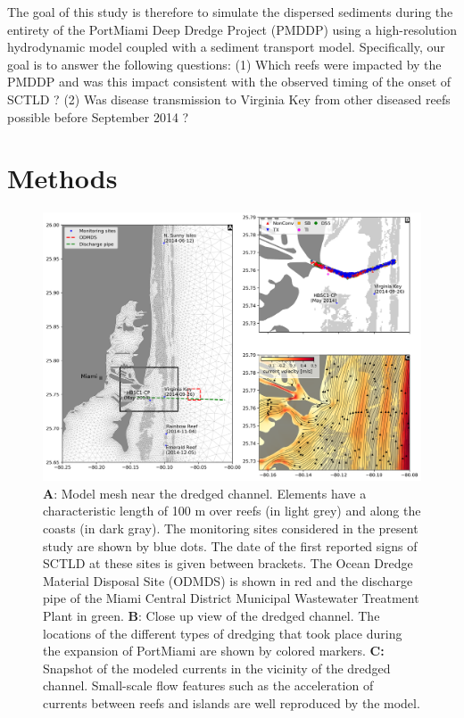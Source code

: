 \documentclass[preprint,12pt,authoryear]{elsarticle}
\begin{document}
The goal of this study is therefore to simulate the dispersed sediments during the entirety of the PortMiami Deep Dredge Project (PMDDP) using a high-resolution hydrodynamic model coupled with a sediment transport model. Specifically, our goal is to answer the following questions: (1) Which reefs were impacted by the PMDDP and was this impact consistent with the observed timing of the onset of SCTLD ?  (2) Was disease transmission to Virginia Key from other diseased reefs possible before September 2014 ? 

\section{Methods}

\begin{figure}
	\centering
	\includegraphics[width=\textwidth]{figures/fig_mesh_onset.png}
	\caption{\textbf{A}: Model mesh near the dredged channel. Elements have a characteristic length of 100 m over reefs (in light grey) and along the coasts (in dark gray). The monitoring sites considered in the present study are shown by blue dots. The date of the first reported signs of SCTLD at these sites is given between brackets. The Ocean Dredge Material Disposal Site (ODMDS) is shown in red and the discharge pipe of the Miami Central District Municipal Wastewater Treatment Plant in green. \textbf{B}: Close up view of the dredged channel. The locations of the different types of dredging that took place during the expansion of PortMiami are shown by colored markers. \textbf{C:} Snapshot of the modeled currents in the vicinity of the dredged channel. Small-scale flow features such as the acceleration of currents between reefs and islands are well reproduced by the model.}
	\label{fig:onset_mesh}
\end{figure}
\end{document}
